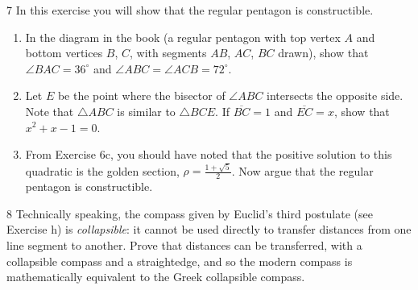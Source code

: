 \begin{problem}{7}
    In this exercise you will show that the regular pentagon is constructible.
    \begin{enumerate}
        \item[(a)] In the diagram in the book (a regular pentagon with top vertex $A$ and
        bottom vertices $B$, $C$, with segments $AB$, $AC$, $BC$ drawn), show that
        $\angle BAC = 36^\circ$ and $\angle ABC = \angle ACB = 72^\circ$.
        \item[(b)] Let $E$ be the point where the bisector of $\angle ABC$ intersects the
        opposite side. Note that $\triangle ABC$ is similar to $\triangle BCE$. If
        $\overline{BC} = 1$ and $\overline{EC} = x$, show that $x^2 + x - 1 = 0$.
        \item[(c)] From Exercise 6c, you should have noted that the positive solution to
        this quadratic is the golden section, $\rho = \frac{1 + \sqrt{5}}{2}$. Now argue
        that the regular pentagon is constructible.
    \end{enumerate}
\end{problem}
\unsolved

\begin{problem}{8}
    Technically speaking, the compass given by Euclid's third postulate (see Exercise h)
    is \emph{collapsible}: it cannot be used directly to transfer distances from one line
    segment to another. Prove that distances can be transferred, with a collapsible compass
    and a straightedge, and so the modern compass is mathematically equivalent to the Greek
    collapsible compass.
\end{problem}
\unsolved
